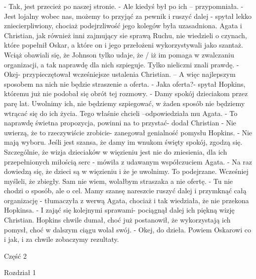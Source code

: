 \documentclass[12pt,a4paper]{book}
\begin{document}
- Tak, jest przecież po naszej stronie. 
- Ale kiedyś był po ich – przypomniała.
- Jest lojalny wobec nas, możemy to przyjąć za pewnik i ruszyć dalej - spytał lekko zniecierpliwiony, chociaż podejrzliwość jego kolegów była uzasadniona. 
Agata i Christian, jak również inni zajmujący sie sprawą Ruchu, nie wiedzieli o czynach, które popełnił Oskar, a które on i jego przełożeni wykorzystywali jako szantaż. Wciąż obawiali się, że Johnson tylko udaje, że / iż im pomaga w zwalczaniu organizacji, a tak naprawdę dla nich szpieguje. Tylko nieliczni znali prawdę. 
- Okej- przypieczętował wcześniejsze ustalenia Christian. – A więc najlepszym sposobem na nich nie będzie straszenie a oferta. 
- Jaka oferta?- spytał Hopkins, któremu już nie podobał się obrót tej rozmowy.
- Damy spokój dzieciakom przez parę lat. Uwolnimy ich, nie będziemy szpiegować, w żaden sposób nie będziemy wtrącać się do ich życia. Tego właśnie chcieli –odpowiedziała mu Agata.
- To naprawdę świetna propozycja, powinni na to przystać- dodał Christian
- Nie uwierzą, że to rzeczywiście zrobicie- zanegował genialność pomysłu Hopkins.
- Nie mają wyboru. Jeśli jest szansa, że damy im wnukom święty spokój, zgodzą się. Szczególnie, że wizja dzieciaków w więzieniu jest nie do zniesienia, dla ich przepełnionych miłością serc - mówiła z udawanym współczuciem Agata. 
- Na raz dowiedzą się, że dzieci są w więzieniu i że je uwolnimy. To podejrzane. Wcześniej myśleli, że zbiegły. Sam nie wiem, wolałbym straszaka a nie ofertę. 
- Tu nie chodzi o sposób, ale o cel. Mamy szansę nareszcie ruszyć dalej i przymknąć całą organizację - tłumaczyła z werwą Agata, chociaż i tak wiedziała, że nie przekona Hopkinsa.
- I zająć się kolejnymi sprawami- pociągnął dalej ich piękną wizję Christian.
Hopkins chwile dumał, choć już postanowił, że wykorzystają ich pomysł, choć w dalszym ciągu wolał swój. 
- Okej, do dzieła. Powiem Oskarowi co i jak, i za chwile zobaczymy rezultaty. 





Część 2

Rozdział 1
\end{document}
